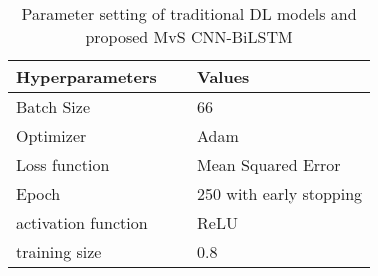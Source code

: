 


  \begin{table}[H]
    \setlength{\tabcolsep}{3pt}
    {\renewcommand{\arraystretch}{1}%
    \begin{longtable}[c]{ p{0.50\linewidth} p{0.50\linewidth} }
      \caption{Parameter setting of traditional DL models and proposed MvS CNN-BiLSTM}
      \label{tab: my-table}
    \\ \hline
    Hyperparameters & Values 
    \\ \hline
    \endhead
    Batch Size               & 66                     \\
    Optimizer                 & Adam                   \\
    Loss function            & Mean Squared Error      \\
    Epoch                    & 250 with early stopping \\
    activation function      & ReLU                   \\
    training size             & 0.8                   \\ \hline
    \end{longtable}}
    \end{table}



\newcommand\mycommfont[1]{\footnotesize\ttfamily\textcolor{blue}{#1}}

